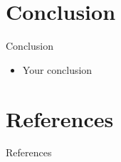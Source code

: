 \documentclass{beamer}
\begin{document}
\section{Conclusion}
\begin{frame}{Conclusion}
\begin{itemize}
\item Your conclusion

\end{itemize}
\end{frame}


\section{References}

\begin{frame}{References}

\nocite{bibitem1}
\nocite{*}
 



\end{frame}
\end{document}
